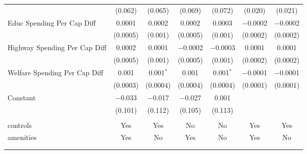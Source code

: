 \begin{table}[!htbp]
\begin{tabular}{@{\extracolsep{5pt}}lcccccc}
  & (0.062) & (0.065) & (0.069) & (0.072) & (0.020) & (0.021) \\ 
  Educ Spending Per Cap Diff & 0.0001 & 0.0002 & 0.0002 & 0.0003 & $-$0.0002 & $-$0.0002 \\ 
  & (0.0005) & (0.001) & (0.0005) & (0.001) & (0.0002) & (0.0002) \\ 
  Highway Spending Per Cap Diff & 0.0002 & 0.0001 & $-$0.0002 & $-$0.0003 & 0.0001 & 0.0001 \\ 
  & (0.0005) & (0.001) & (0.0005) & (0.001) & (0.0002) & (0.0002) \\ 
  Welfare Spending Per Cap Diff & 0.001 & 0.001$^{*}$ & 0.001 & 0.001$^{*}$ & $-$0.0001 & $-$0.0001 \\ 
  & (0.0003) & (0.0004) & (0.0004) & (0.0004) & (0.0001) & (0.0001) \\ 
  Constant & $-$0.033 & $-$0.017 & $-$0.027 & 0.001 &  &  \\ 
  & (0.101) & (0.112) & (0.105) & (0.113) &  &  \\ 
 \hline \\[-1.8ex] 
controls & Yes & Yes & No & No & Yes & Yes \\ 
amenities & Yes & No & Yes & No & Yes & No \\ 
\hline \\[-1.8ex] 
\hline 
\hline \\[-1.8ex] 
\end{tabular} 
\end{table} 
